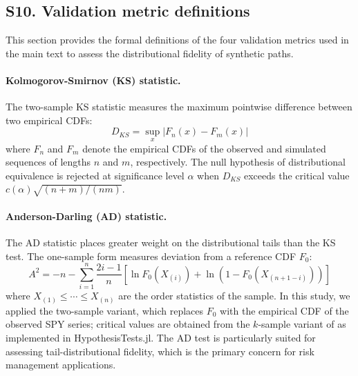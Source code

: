 \clearpage

\subsection*{S10. Validation metric definitions}
\label{sec:validation_metrics}

This section provides the formal definitions of the four validation metrics used in the main text to assess the distributional fidelity of synthetic paths.

\paragraph{Kolmogorov-Smirnov (KS) statistic.}
The two-sample KS statistic \cite{kolmogorov_1933, smirnov_1948} measures the maximum pointwise difference between two empirical CDFs:
\begin{equation}
    D_{KS} = \sup_{x} \left\lvert F_n(x) - F_m(x) \right\rvert
    \label{eq:ks_stat}
\end{equation}
where $F_n$ and $F_m$ denote the empirical CDFs of the observed and simulated sequences of lengths $n$ and $m$, respectively. The null hypothesis of distributional equivalence is rejected at significance level $\alpha$ when $D_{KS}$ exceeds the critical value $c(\alpha)\sqrt{(n+m)/(nm)}$.

\paragraph{Anderson-Darling (AD) statistic.}
The AD statistic \cite{anderson_darling_1952} places greater weight on the distributional tails than the KS test. The one-sample form measures deviation from a reference CDF $F_0$:
\begin{equation}
    A^2 = -n - \sum_{i=1}^{n} \frac{2i-1}{n}\left[\ln F_0(X_{(i)}) + \ln\left(1 - F_0(X_{(n+1-i)})\right)\right]
    \label{eq:ad_stat}
\end{equation}
where $X_{(1)} \le \cdots \le X_{(n)}$ are the order statistics of the sample. In this study, we applied the two-sample variant, which replaces $F_0$ with the empirical CDF of the observed SPY series; critical values are obtained from the $k$-sample variant of \citeauthor{anderson_darling_1952} as implemented in HypothesisTests.jl. The AD test is particularly suited for assessing tail-distributional fidelity, which is the primary concern for risk management applications.

